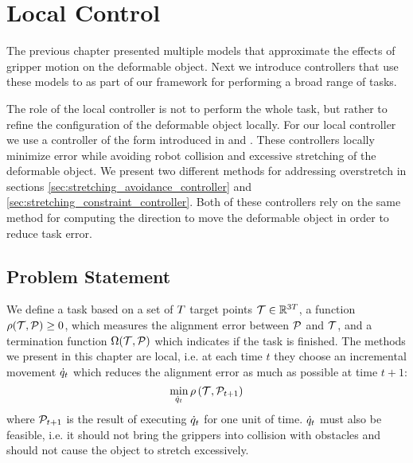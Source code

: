 \chapter{Local Control}
\label{chap:local_control}

The previous chapter presented multiple models that approximate the effects of gripper motion on the deformable object. Next we introduce controllers that use these models to as part of our framework for performing a broad range of tasks.

The role of the local controller is not to perform the whole task, but rather to refine the configuration of the deformable object locally. For our local controller we use a controller of the form introduced in \cite{Berenson2013} and \cite{McConachie2018}. These controllers locally minimize error while avoiding robot collision and excessive stretching of the deformable object. We present two different methods for addressing overstretch in sections \ref{sec:stretching_avoidance_controller} and \ref{sec:stretching_constraint_controller}. Both of these controllers rely on the same method for computing the direction to move the deformable object in order to reduce task error.

\section{Problem Statement}

We define a task based on a set of $T$ target points $\mathcal{T} \in \mathbb{R}^{3 T}$, a function $\rho(\mathcal{T}, \mathcal{P}) \geq 0$, which measures the alignment error between $\mathcal{P}$ and $\mathcal{T}$, and a termination function $\Omega(\mathcal{T}, \mathcal{P})$ which indicates if the task is finished. The methods we present in this chapter are local, i.e. at each time $t$ they choose an incremental movement $\dot{q}_t$ which reduces the alignment error as much as possible at time $t+1$:
\begin{equation}
    \min_{\dot{q}_t} \rho \left(\mathcal{T}, \mathcal{P}_{t+1} \right)
    \label{eqn:ctrl_obj}
\end{equation}
where $\mathcal{P}_{t+1}$ is the result of executing $\dot{q}_t$ for one unit of time. $\dot{q}_t$ must also be feasible, i.e. it should not bring the grippers into collision with obstacles and should not cause the object to stretch excessively.



